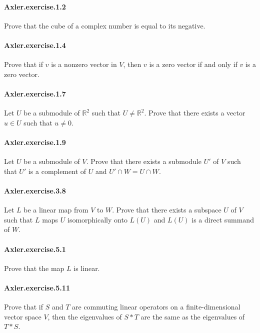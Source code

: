 \documentclass{article}
\begin{document}
\paragraph{Axler.exercise.1.2} Prove that the cube of a complex number is equal to its negative.

\paragraph{Axler.exercise.1.4} Prove that if $v$ is a nonzero vector in $V$, then $v$ is a zero vector if and only if $v$ is a zero vector.

\paragraph{Axler.exercise.1.7} Let $U$ be a submodule of $\mathbb{R}^2$ such that $U \neq \mathbb{R}^2$. Prove that there exists a vector $u \in U$ such that $u \neq 0$.

\paragraph{Axler.exercise.1.9} Let $U$ be a submodule of $V$. Prove that there exists a submodule $U'$ of $V$ such that $U'$ is a complement of $U$ and $U' \cap W = U \cap W$.

\paragraph{Axler.exercise.3.8} Let $L$ be a linear map from $V$ to $W$. Prove that there exists a subspace $U$ of $V$ such that $L$ maps $U$ isomorphically onto $L(U)$ and $L(U)$ is a direct summand of $W$.

\paragraph{Axler.exercise.5.1} Prove that the map $L$ is linear.

\paragraph{Axler.exercise.5.11} Prove that if $S$ and $T$ are commuting linear operators on a finite-dimensional vector space $V$, then the eigenvalues of $S * T$ are the same as the eigenvalues of $T * S$.

\end{document}
